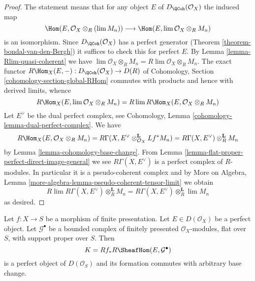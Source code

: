 \begin{proof}
The statement means that for any object $E$ of
$D_\QCoh(\mathcal{O}_X)$ the induced map
$$
\Hom(E, \mathcal{O}_X \otimes_R (\lim M_n))
\longrightarrow
\Hom(E, \lim \mathcal{O}_X \otimes_R M_n)
$$
is an isomorphism. Since $D_\QCoh(\mathcal{O}_X)$ has
a perfect generator (Theorem \ref{theorem-bondal-van-den-Bergh})
it suffices to check this for perfect $E$.
By Lemma \ref{lemma-Rlim-quasi-coherent} we have
$\lim \mathcal{O}_X \otimes_R M_n = R\lim \mathcal{O}_X \otimes_R M_n$.
The exact functor
$R\Hom_X(E, -) : D_\QCoh(\mathcal{O}_X) \to D(R)$
of Cohomology, Section \ref{cohomology-section-global-RHom}
commutes with products and hence with derived limits, whence
$$
R\Hom_X(E, \lim \mathcal{O}_X \otimes_R M_n) =
R\lim R\Hom_X(E, \mathcal{O}_X \otimes_R M_n)
$$
Let $E^\vee$ be the dual perfect complex, see
Cohomology, Lemma \ref{cohomology-lemma-dual-perfect-complex}.
We have
$$
R\Hom_X(E, \mathcal{O}_X \otimes_R M_n) =
R\Gamma(X, E^\vee \otimes_{\mathcal{O}_X}^\mathbf{L} Lf^*M_n) =
R\Gamma(X, E^\vee) \otimes_R^\mathbf{L} M_n
$$
by Lemma \ref{lemma-cohomology-base-change}.
From Lemma \ref{lemma-flat-proper-perfect-direct-image-general}
we see $R\Gamma(X, E^\vee)$ is a perfect complex of $R$-modules.
In particular it is a pseudo-coherent complex and by
More on Algebra, Lemma \ref{more-algebra-lemma-pseudo-coherent-tensor-limit}
we obtain
$$
R\lim R\Gamma(X, E^\vee) \otimes_R^\mathbf{L} M_n =
R\Gamma(X, E^\vee) \otimes_R^\mathbf{L} \lim M_n
$$
as desired.
\end{proof}

\begin{lemma}
\label{lemma-base-change-RHom-perfect}
Let $f : X \to S$ be a morphism of finite presentation.
Let $E \in D(\mathcal{O}_X)$ be a perfect object. Let $\mathcal{G}^\bullet$
be a bounded complex of finitely presented $\mathcal{O}_X$-modules,
flat over $S$, with support proper over $S$. Then
$$
K = Rf_*R\SheafHom(E, \mathcal{G}^\bullet)
$$
is a perfect object of $D(\mathcal{O}_S)$ and its formation
commutes with arbitrary base change.
\end{lemma}

